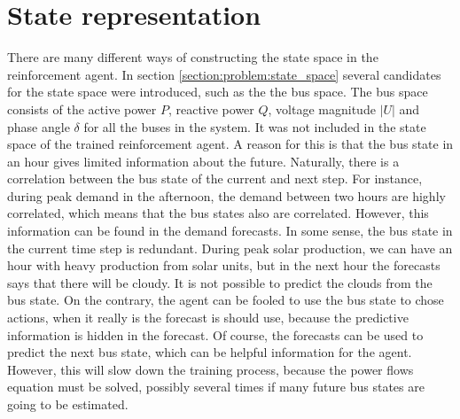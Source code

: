 \documentclass[class=book, crop=false, 11pt]{standalone}
\begin{document}
\section{State representation}
There are many different ways of constructing the state space in the reinforcement agent. In section \ref{section:problem:state_space} several candidates for the state space were introduced, such as the the bus space. The bus space consists of the active power $P$, reactive power $Q$, voltage magnitude $|U|$ and phase angle $\delta$ for all the buses in the system. It was not included in the state space of the trained reinforcement agent. A reason for this is that the bus state in an hour gives limited information about the future. Naturally, there is a correlation between the bus state of the current and next step. For instance, during peak demand in the afternoon, the demand between two hours are highly correlated, which means that the bus states also are correlated. However, this information can be found in the demand forecasts. In some sense, the bus state in the current time step is redundant. During peak solar production, we can have an hour with heavy production from solar units, but in the next hour the forecasts says that there will be cloudy. It is not possible to predict the clouds from the bus state. On the contrary, the agent can be fooled to use the bus state to chose actions, when it really is the forecast is should use, because the predictive information is hidden in the forecast. Of course, the forecasts can be used to predict the next bus state, which can be helpful information for the agent. However, this will slow down the training process, because the power flows equation must be solved, possibly several times if many future bus states are going to be estimated. 
\end{document}
